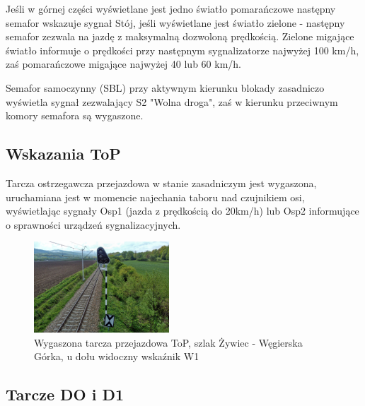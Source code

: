 Jeśli w górnej części wyświetlane jest jedno światło pomarańczowe następny semafor wskazuje sygnał Stój, jeśli wyświetlane jest światło zielone - następny semafor zezwala na jazdę z maksymalną dozwoloną prędkością. Zielone migające światło informuje o prędkości przy następnym sygnalizatorze najwyżej 100 km/h, zaś pomarańczowe migające najwyżej 40 lub 60 km/h.

Semafor samoczynny (SBL) przy aktywnym kierunku blokady zasadniczo wyświetla sygnał zezwalający S2 "Wolna droga", zaś w kierunku przeciwnym komory semafora są wygaszone.

\subsection{Wskazania ToP}
	Tarcza ostrzegawcza przejazdowa w stanie zasadniczym jest wygaszona, uruchamiana jest w momencie najechania taboru nad czujnikiem osi, wyświetlając sygnały Osp1 (jazda z prędkością do 20km/h) lub Osp2 informujące o sprawności urządzeń sygnalizacyjnych.
\begin{figure}
	\includegraphics[width=0.45\textwidth]{skryptkierownik-img/tarcza-top.jpg}
	\caption{Wygaszona tarcza przejazdowa ToP, szlak Żywiec - Węgierska Górka, u dołu widoczny wskaźnik W1}
\end{figure}

\subsection{Tarcze DO i D1}

